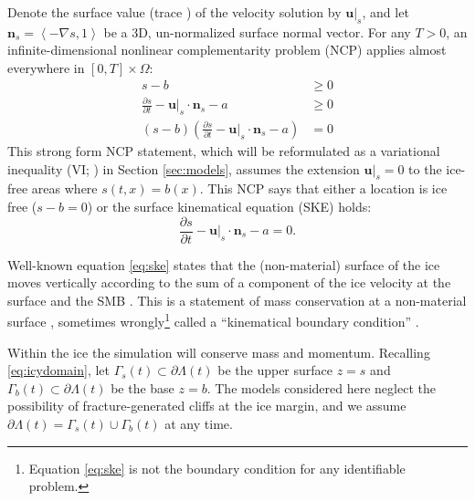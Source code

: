 \documentclass[hidelinks,onefignum,onetabnum,final]{siamart220329}  %
\newcommand{\grad}{\nabla}
\newcommand{\bn}{\mathbf{n}}
\newcommand{\bu}{\mathbf{u}}
\begin{document}
Denote the surface value (trace \cite{Evans2010}) of the velocity solution by $\bu|_s$, and let $\bn_s = \left<-\grad s,1\right>$ be a 3D, un-normalized surface normal vector.  For any $T>0$, an infinite-dimensional nonlinear complementarity problem (NCP) \cite{Bueler2021conservation,FacchineiPang2003,SchoofHewitt2013} applies almost everywhere in $[0,T]\times \Omega$:
\begin{subequations}
\label{eq:ncp}
\begin{align}
s - b &\ge 0 \\
\frac{\partial s}{\partial t} - \bu|_s \cdot \bn_s - a &\ge 0 \\
(s - b) \left(\frac{\partial s}{\partial t} - \bu|_s \cdot \bn_s - a\right) &= 0
\end{align}
\end{subequations}
This strong form NCP statement, which will be reformulated as a variational inequality (VI; \cite{KinderlehrerStampacchia1980}) in Section \ref{sec:models}, assumes the extension $\bu|_s=0$  to the ice-free areas where $s(t,x)=b(x)$.  This NCP says that either a location is ice free ($s-b=0$) or the surface kinematical equation (SKE) holds:
\begin{equation}
\frac{\partial s}{\partial t} - \bu|_s \cdot \bn_s - a = 0.  \label{eq:ske}
\end{equation}

Well-known equation \eqref{eq:ske} states that the (non-material) surface of the ice moves vertically according to the sum of a component of the ice velocity at the surface and the SMB \cite{SchoofHewitt2013}.  This is a statement of mass conservation at a non-material surface \cite{Aschwandenetal2012}, sometimes wrongly\footnote{Equation \eqref{eq:ske} is not the boundary condition for any identifiable problem.} called a ``kinematical boundary condition'' \cite{GreveBlatter2009}.

Within the ice the simulation will conserve mass and momentum.  Recalling \eqref{eq:icydomain}, let $\Gamma_s(t) \subset \partial \Lambda(t)$ be the upper surface $z=s$ and
$\Gamma_b(t) \subset \partial \Lambda(t)$ be the base $z=b$.  The models considered here neglect the possibility of fracture-generated cliffs at the ice margin, and we assume $\partial \Lambda(t) = \Gamma_s(t) \cup \Gamma_b(t)$ at any time.
\end{document}
